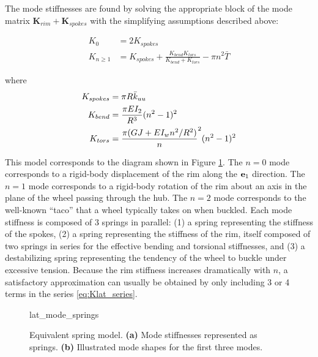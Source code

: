 \documentclass[\rootdir/thesis.tex]{subfiles}
\begin{document}
The mode stiffnesses are found by solving the appropriate block of the mode matrix $\mathbf{K}_{rim} + \mathbf{K}_{spokes}$ with the simplifying assumptions described above:

\begin{subequations}
\begin{align}
K_0 &= 2 K_{spokes}\\
K_{n\geq1} & = K_{spokes} + \frac{K_{bend}K_{tors}}{K_{bend} + K_{tors}} - \pi n^2 \bar{T}
\label{eq:Kn}
\end{align}
\end{subequations}

where
\begin{align*}
K_{spokes} &= \pi R \bar{k}_{uu}\\
K_{bend} &= \frac{\pi EI_2}{R^3} (n^2-1)^2\\
K_{tors} &= \frac{\pi (GJ + EI_w n^2/R^2)}n^2(n^2-1)^2
\end{align*}

This model corresponds to the diagram shown in Figure \ref{fig:lat_mode_springs}. The $n=0$ mode corresponds to a rigid-body displacement of the rim along the $\mathbf{e}_1$ direction. The $n=1$ mode corresponds to a rigid-body rotation of the rim about an axis in the plane of the wheel passing through the hub. The $n=2$ mode corresponds to the well-known ``taco'' that a wheel typically takes on when buckled. Each mode stiffness is composed of 3 springs in parallel: (1) a spring representing the stiffness of the spokes, (2) a spring representing the stiffness of the rim, itself composed of two springs in series for the effective bending and torsional stiffnesses, and (3) a destabilizing spring representing the tendency of the wheel to buckle under excessive tension. Because the rim stiffness increases dramatically with $n$, a satisfactory approximation can usually be obtained by only including 3 or 4 terms in the series \eqref{eq:Klat_series}.

\begin{figure}[h]
\centering
{lat_mode_springs}
\caption{Equivalent spring model. \textbf{(a)} Mode stiffnesses represented as springs. \textbf{(b)} Illustrated mode shapes for the first three modes.}
\label{fig:lat_mode_springs}
\end{figure}
\end{document}
